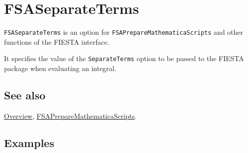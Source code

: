 \documentclass[../FeynHelpersManual.tex]{subfiles}
\begin{document}
\hypertarget{fsaseparateterms}{
\section{FSASeparateTerms}\label{fsaseparateterms}}

\texttt{FSASeparateTerms} is an option for
\texttt{FSAPrepareMathematicaScripts} and other functions of the FIESTA
interface.

It specifies the value of the \texttt{SeparateTerms} option to be passed
to the FIESTA package when evaluating an integral.

\subsection{See also}

\hyperlink{toc}{Overview},
\hyperlink{fsapreparemathematicascripts}{FSAPrepareMathematicaScripts}.

\subsection{Examples}
\end{document}
